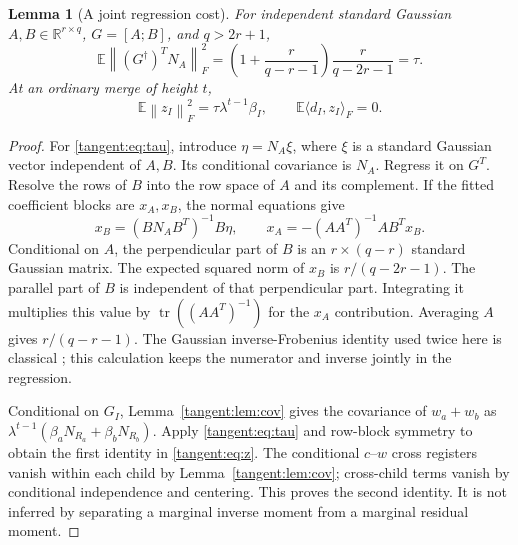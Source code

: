\documentclass[11pt,oneside,openany,a4paper]{book}
\numberwithin{equation}{chapter}
\newtheorem{lemma}[theorem]{Lemma}
\theoremstyle{definition}
\theoremstyle{remark}
\newcommand{\R}{\mathbb R}\newcommand{\E}{\mathbb E}\newcommand{\Prb}{\mathbb P}\newcommand{\PP}{\mathbb P}
\newcommand{\F}[1]{\left\lVert#1\right\rVert_F}
\DeclareMathOperator{\tr}{tr}\DeclareMathOperator{\rank}{rank}
\begin{document}
\begin{lemma}[A joint regression cost]\label{tangent:lem:tau}
For independent standard Gaussian $A,B\in\R^{r\times q}$, $G=[A;B]$, and $q>2r+1$,
\begin{equation}\label{tangent:eq:tau}
 \E\F{(G^\dagger)^TN_A}^2
 =\left(1+\frac r{q-r-1}\right)\frac r{q-2r-1}=\tau.
\end{equation}
At an ordinary merge of height $t$,
\begin{equation}\label{tangent:eq:z}
 \E\F{z_I}^2=\tau\lambda^{t-1}\beta_I,
 \qquad \E\langle d_I,z_I\rangle_F=0.
\end{equation}
\end{lemma}
\begin{proof}
For \eqref{tangent:eq:tau}, introduce $\eta=N_A\xi$, where $\xi$ is a standard Gaussian vector independent of $A,B$. Its conditional covariance is $N_A$. Regress it on $G^T$. Resolve the rows of $B$ into the row space of $A$ and its complement. If the fitted coefficient blocks are $x_A,x_B$, the normal equations give
\[
 x_B=(BN_AB^T)^{-1}B\eta,\qquad
 x_A=-(AA^T)^{-1}AB^Tx_B.
\]
Conditional on $A$, the perpendicular part of $B$ is an $r\times(q-r)$ standard Gaussian matrix. The expected squared norm of $x_B$ is $r/(q-2r-1)$. The parallel part of $B$ is independent of that perpendicular part. Integrating it multiplies this value by $\tr((AA^T)^{-1})$ for the $x_A$ contribution. Averaging $A$ gives $r/(q-r-1)$. The Gaussian inverse-Frobenius identity used twice here is classical \cite{HMT}; this calculation keeps the numerator and inverse jointly in the regression.

Conditional on $G_I$, Lemma~\ref{tangent:lem:cov} gives the covariance of $w_a+w_b$ as $\lambda^{t-1}(\beta_aN_{R_a}+\beta_bN_{R_b})$. Apply \eqref{tangent:eq:tau} and row-block symmetry to obtain the first identity in \eqref{tangent:eq:z}. The conditional $c$--$w$ cross registers vanish within each child by Lemma~\ref{tangent:lem:cov}; cross-child terms vanish by conditional independence and centering. This proves the second identity. It is not inferred by separating a marginal inverse moment from a marginal residual moment.
\end{proof}
\end{document}
